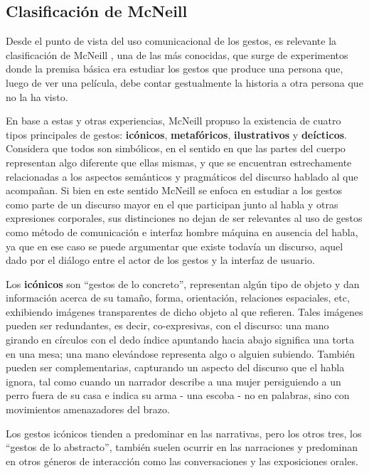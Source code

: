 

\subsection{Clasificación de McNeill}

Desde el punto de vista del uso comunicacional de los gestos, es relevante la clasificación de McNeill \cite{mcneill92,Studdert1993}, una de las más conocidas, que surge de experimentos donde la premisa básica era estudiar los gestos que produce una persona que, luego de ver una película, debe contar gestualmente la historia a otra persona que no la ha visto. 

En base a estas y otras experiencias, McNeill propuso la existencia de cuatro tipos principales de gestos: \textbf{icónicos}, \textbf{metafóricos}, \textbf{ilustrativos} y \textbf{deícticos}. Considera que todos son simbólicos, en el sentido en que las partes del cuerpo representan algo diferente que ellas mismas, y que se encuentran estrechamente relacionadas a los aspectos semánticos y pragmáticos del discurso hablado al que acompañan. Si bien en este sentido McNeill se enfoca en estudiar a los gestos como parte de un discurso mayor en el que participan junto al habla y otras expresiones corporales, sus distinciones no dejan de ser relevantes al uso de gestos como método de comunicación e interfaz hombre máquina en ausencia del habla, ya que en ese caso se puede argumentar que existe todavía un discurso, aquel dado por el diálogo entre el actor de los gestos y la interfaz de usuario.

Los \textbf{icónicos} son ``gestos de lo concreto'', representan algún tipo de objeto y dan información acerca de su tamaño, forma, orientación, relaciones espaciales, etc, exhibiendo imágenes transparentes de dicho objeto al que refieren.
Tales imágenes pueden ser redundantes, es decir, co-expresivas, con el discurso: una mano girando en círculos con el dedo índice apuntando hacia abajo significa una torta en una mesa; una mano elevándose representa algo o alguien subiendo. También pueden ser complementarias, capturando un aspecto del discurso que el habla ignora, tal como cuando un narrador describe a una mujer persiguiendo a un perro fuera de su casa e indica su arma - una escoba - no en palabras, sino con movimientos amenazadores del brazo.

Los gestos icónicos tienden a predominar en las narrativas, pero los otros tres, los ``gestos de lo abstracto'', también suelen ocurrir en las narraciones y predominan en otros géneros de interacción como las conversaciones y las exposiciones orales. 

